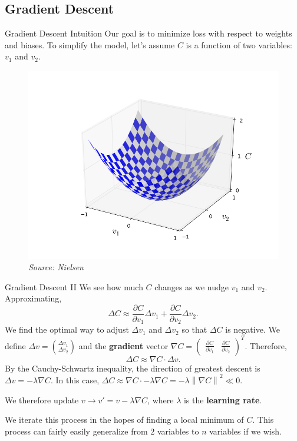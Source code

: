 \documentclass[xcolor=dvipsnames, fontsize=11pt, %
pagesize, %
parskip=half-, t]{beamer}
\newcommand{\norm}[1]{\left\lVert#1\right\rVert}
\begin{document}
 \subsection{Gradient Descent}
 \begin{frame}{Gradient Descent Intuition}
Our goal is to minimize loss with respect to weights and biases. To simplify the model, let's assume $C$ is a function of two variables: $v_1$ and $v_2$. 
\begin{figure}
\includegraphics[scale=0.36]{valley.png}
\caption{\textit{Source: Nielsen}}
\end{figure}
 \end{frame}
 \begin{frame}{Gradient Descent II}
 We see how much $C$ changes as we nudge $v_1$ and $v_2$. Approximating, $$\Delta C\approx \frac{\partial C}{\partial v_1}\Delta v_1+\frac{\partial C}{\partial v_2}\Delta v_2.$$ \pause We  find the optimal way to adjust $\Delta v_1$ and $\Delta v_2$ so that $\Delta C$ is negative. We define $\Delta v=\binom{\Delta v_1}{\Delta v_2}$ and the \textbf{gradient} vector $\nabla C=\begin{pmatrix} \frac{\partial C}{\partial v_1} & \frac{\partial C}{\partial v_2} \end{pmatrix}^{T}.$\pause 
 Therefore, $$\Delta C\approx \nabla C\cdot \Delta v.$$ \pause By the Cauchy-Schwartz inequality, the direction of greatest descent is $\Delta v=-\lambda \nabla C$. In this case, $\Delta C\approx \nabla C\cdot -\lambda \nabla C=-\lambda \norm{\nabla C}^2\ll 0$. \pause 
 
 \vspace{0.04\textheight}
 We therefore update $v\to v'=v-\lambda \nabla C$, where $\lambda$ is the \textbf{learning rate}. \pause
 
We iterate this process in the hopes of finding a local minimum of $C$. This process can fairly easily generalize from $2$ variables to $n$ variables if we wish. 
 \end{frame}
\end{document}

